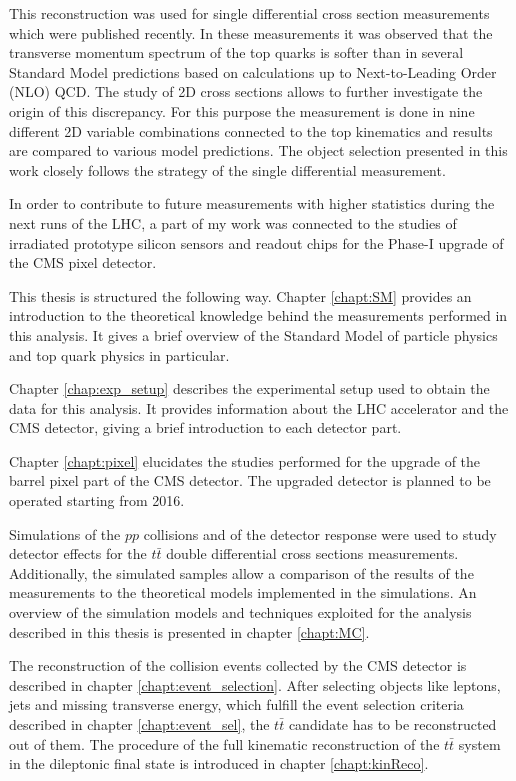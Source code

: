 This reconstruction was used for single differential cross section measurements \cite{Khachatryan:2015oqa} which were 
published recently. In these measurements it was observed that the transverse momentum spectrum of the 
top quarks is softer than in several Standard Model predictions based on calculations up to Next-to-Leading Order (NLO) QCD. 
The study of 2D cross sections allows to further investigate the origin of this discrepancy. For this purpose the measurement 
is done in nine different 2D variable combinations connected to the top kinematics and results are compared to various model 
predictions. The object selection presented in this work closely follows the strategy of the single differential measurement.

In order to contribute to future measurements with higher statistics during
the next runs of the LHC, a part of my work was connected to the studies of irradiated
prototype silicon sensors and readout chips for the Phase-I upgrade of the CMS pixel detector.

This thesis is structured the following way. Chapter \ref{chapt:SM} provides an introduction to the theoretical
knowledge behind the measurements performed in this analysis. It gives a brief overview of the Standard
Model of particle physics and top quark physics in particular.

Chapter \ref{chap:exp_setup} describes the experimental setup used to obtain the data for this analysis.
It provides information about the LHC accelerator and the CMS detector, giving a brief introduction to each detector part.

Chapter \ref{chapt:pixel} elucidates the studies performed for the
upgrade of the barrel pixel part of the CMS detector. The upgraded detector is planned to be operated starting from 2016.

Simulations of the $pp$ collisions and of the detector response were used to study detector effects for the $t\bar{t}$ 
double differential cross sections measurements. Additionally, the simulated samples allow a comparison of the results of 
the measurements to the theoretical models implemented in the simulations. An overview of the simulation models and 
techniques exploited for the analysis described in this thesis is presented in chapter \ref{chapt:MC}.

The reconstruction of the collision events collected by the CMS detector is described
in chapter \ref{chapt:event_selection}. After selecting objects like leptons, jets and missing transverse energy, which 
fulfill the event selection criteria described in chapter \ref{chapt:event_sel}, the $t\bar{t}$ candidate has to be reconstructed out
of them. The procedure of the full kinematic reconstruction of the $t\bar{t}$ system in the dileptonic final state is introduced
in chapter \ref{chapt:kinReco}.

